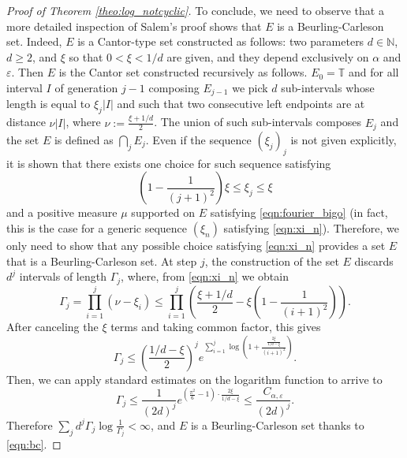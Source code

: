 \documentclass{birkjour}
\numberwithin{equation}{section}
\theoremstyle{plain}
\theoremstyle{definition}
\newcommand{\T}{\mathbb{T}}
\newcommand{\N}{\mathbb{N}}
\newcommand{\1}{\mathds{1}}
\begin{document}
\begin{proof}[Proof of Theorem \ref{theo:log_notcyclic}]
To conclude, we need to observe that a more detailed inspection of Salem's proof shows that $E$ is a Beurling-Carleson set. Indeed, $E$ is a Cantor-type set constructed as follows: two parameters $d \in \N$, $d\geq 2$, and $\xi$ so that $0<\xi<1/d$ are given, and they depend exclusively on $\alpha$ and $\varepsilon$. Then $E$ is the Cantor set constructed recursively as follows. $E_0=\T$ and for all interval $I$ of generation $j-1$ composing $E_{j-1}$ we pick $d$ sub-intervals whose length is equal to $\xi_j|I|$ and such that two consecutive left endpoints are at distance $\nu|I|$, where $\nu:=\frac{\xi+1/d}{2}$. The union of such sub-intervals composes $E_j$ and the set $E$ is defined as $\bigcap_jE_j$. Even if the sequence $(\xi_j)_j$ is not given explicitly, it is shown that there exists one choice for such sequence satisfying
\begin{equation}
\label{eqn:xi_n}
\left(1-\frac{1}{(j+1)^2}\right)\xi\le\xi_j\le\xi
\end{equation}
and a positive measure $\mu$ supported on $E$ satisfying \eqref{eqn:fourier_bigo} (in fact, this is the case for a generic sequence $(\xi_n)$ satisfying \eqref{eqn:xi_n}). Therefore, we only need to show that any possible choice satisfying \eqref{eqn:xi_n} provides a set $E$ that is a Beurling-Carleson set. At step $j$, the construction of the set $E$ discards $d^j$ intervals of length $\Gamma_j$, where, from \eqref{eqn:xi_n} we obtain
\[
\Gamma_j=\prod_{i=1}^j(\nu-\xi_i)\le \prod_{i=1}^j\left(\frac{\xi+1/d}{2}-\xi\left(1-\frac{1}{(i+1)^2}\right)\right).\]
After canceling the $\xi$ terms and taking common factor, this gives 
\[\Gamma_j \leq \left(\frac{1/d-\xi}{2}\right)^je^{\sum_{i=1}^j\log \left(1+\frac{\frac{2\xi}{1/d-\xi}}{(i+1)^2}\right)}.\]
Then, we can apply standard estimates on the logarithm function to arrive to
\[\Gamma_j \le \frac{1}{(2d)^j}e^{\left(\frac{\pi^2}{6}-1\right)\cdot \frac{2\xi}{1/d-\xi}} \le \frac{C_{\alpha, \varepsilon}}{(2d)^j}.
\]
Therefore $\sum_jd^j\Gamma_j\log\frac{1}{\Gamma_j}<\infty$, and $E$ is a Beurling-Carleson set thanks to \eqref{eqn:bc}. 

\end{proof}

 
 
\end{document}
